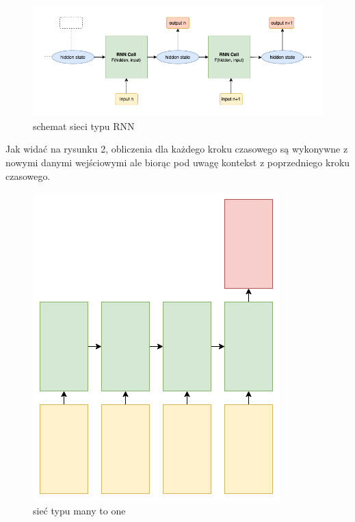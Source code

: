 \begin{figure}[!ht]
\includegraphics[width=\linewidth]{./images/rnn.png}
\caption{schemat sieci typu RNN}
\label{fig:test3}
\end{figure}
Jak widać na rysunku 2, obliczenia dla każdego kroku czasowego są wykonywne z nowymi danymi wejściowymi
ale biorąc pod uwagę kontekst z poprzedniego kroku czasowego. 
\begin{figure}
\vspace{-4mm}
\includegraphics[width=\linewidth]{./images/many-to-one.png}
\caption{sieć typu many to one}
\label{fig:test3}
\vspace{-4mm}
\end{figure}
